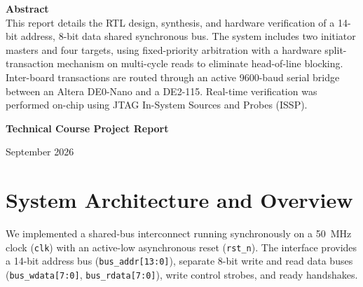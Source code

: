 \documentclass[11pt,a4paper]{article}
\begin{document}
\begin{titlepage}
    \vspace{2.0cm}
    
    \begin{minipage}[c]{0.95\textwidth}
        \centering
        \small\textbf{Abstract}\\
        This report details the RTL design, synthesis, and hardware verification of a 14-bit address, 8-bit data shared synchronous bus. The system includes two initiator masters and four targets, using fixed-priority arbitration with a hardware split-transaction mechanism on multi-cycle reads to eliminate head-of-line blocking. Inter-board transactions are routed through an active 9600-baud serial bridge between an Altera DE0-Nano and a DE2-115. Real-time verification was performed on-chip using JTAG In-System Sources and Probes (ISSP).
    \end{minipage}

    \vfill
    {\large\bfseries Technical Course Project Report \par}
    \vspace{0.2cm}
    {\normalsize September 2026 \par}
\end{titlepage}

\newpage
\tableofcontents
\newpage

\section{System Architecture and Overview}

We implemented a shared-bus interconnect running synchronously on a 50~MHz clock (\texttt{clk}) with an active-low asynchronous reset (\texttt{rst\_n}). The interface provides a 14-bit address bus (\texttt{bus\_addr[13:0]}), separate 8-bit write and read data buses (\texttt{bus\_wdata[7:0]}, \texttt{bus\_rdata[7:0]}), write control strobes, and ready handshakes.
\end{document}

